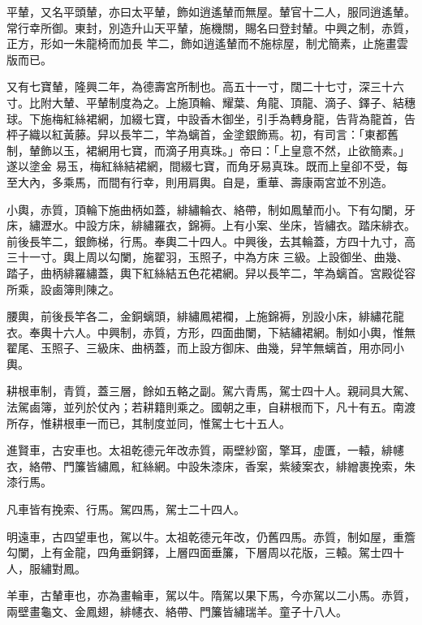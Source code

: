 \begin{pinyinscope}
 平輦，又名平頭輦，亦曰太平輦，飾如逍遙輦而無屋。輦官十二人，服同逍遙輦。常行幸所御。東封，別造升山天平輦，施機關，賜名曰登封輦。中興之制，赤質，正方，形如一朱龍椅而加長
 竿二，飾如逍遙輦而不施棕屋，制尤簡素，止施畫雲版而已。



 又有七寶輦，隆興二年，為德壽宮所制也。高五十一寸，闊二十七寸，深三十六寸。比附大輦、平輦制度為之。上施頂輪、耀葉、角龍、頂龍、滴子、鐸子、結穗球。下施梅紅絲裙網，加綴七寶，中設香木御坐，引手為轉身龍，告背為龍首，告枰子織以紅黃藤。舁以長竿二，竿為螭首，金塗銀飾焉。初，有司言：「東都舊制，輦飾以玉，裙網用七寶，而滴子用真珠。」帝曰：「上皇意不然，止欲簡素。」遂以塗金
 易玉，梅紅絲結裙網，間綴七寶，而角牙易真珠。既而上皇卻不受，每至大內，多乘馬，而間有行幸，則用肩輿。自是，重華、壽康兩宮並不別造。



 小輿，赤質，頂輪下施曲柄如蓋，緋繡輪衣、絡帶，制如鳳輦而小。下有勾闌，牙床，繡瀝水。中設方床，緋繡羅衣，錦褥。上有小案、坐床，皆繡衣。踏床緋衣。前後長竿二，銀飾梯，行馬。奉輿二十四人。中興後，去其輪蓋，方四十九寸，高三十一寸。輿上周以勾闌，施翟羽，玉照子，中為方床
 三級。上設御坐、曲幾、踏子，曲柄緋羅繡蓋，輿下紅絲結五色花裙網。舁以長竿二，竿為螭首。宮殿從容所乘，設鹵簿則陳之。



 腰輿，前後長竿各二，金銅螭頭，緋繡鳳裙襴，上施錦褥，別設小床，緋繡花龍衣。奉輿十六人。中興制，赤質，方形，四面曲闌，下結繡裙網。制如小輿，惟無翟尾、玉照子、三級床、曲柄蓋，而上設方御床、曲幾，舁竿無螭首，用亦同小輿。



 耕根車制，青質，蓋三層，餘如五輅之副。駕六青馬，駕士四十人。親祠具大駕、法駕鹵簿，並列於仗內；若耕籍則乘之。國朝之車，自耕根而下，凡十有五。南渡所存，惟耕根車一而已，其制度並同，惟駕士七十五人。



 進賢車，古安車也。太祖乾德元年改赤質，兩壁紗窗，擎耳，虛匱，一轅，緋幰衣，絡帶、門簾皆繡鳳，紅絲網。中設朱漆床，香案，紫綾案衣，緋繒裹挽索，朱漆行馬。



 凡車皆有挽索、行馬。駕四馬，駕士二十四人。



 明遠車，古四望車也，駕以牛。太祖乾德元年改，仍舊四馬。赤質，制如屋，重簷勾闌，上有金龍，四角垂銅鐸，上層四面垂簾，下層周以花版，三轅。駕士四十人，服繡對鳳。



 羊車，古輦車也，亦為畫輪車，駕以牛。隋駕以果下馬，今亦駕以二小馬。赤質，兩壁畫龜文、金鳳翅，緋幰衣、絡帶、門簾皆繡瑞羊。童子十八人。




\end{pinyinscope}
